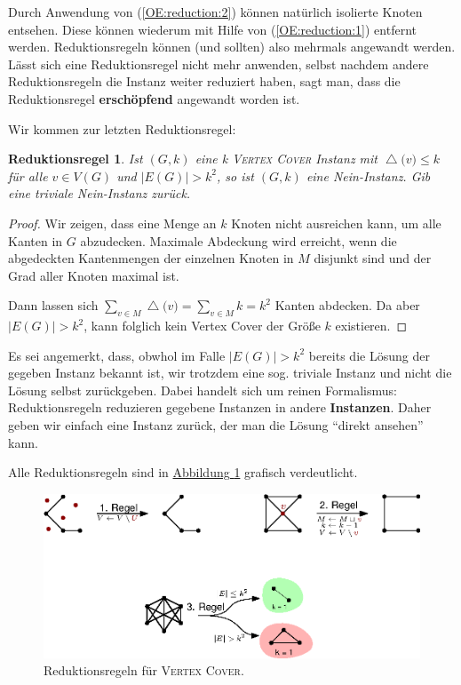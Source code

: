 \documentclass[a4paper,ngerman]{atseminar}
\renewcommand{\deg}[1]{\ensuremath{\operatorname{\triangle}\bigl(#1\bigr)}\xspace}
\newtheorem{reductionrule}[theorem]{\textbf{Reduktionsregel}}
\begin{document}
\begin{example}
    \noindent
    Durch Anwendung von (\ref{OE:reduction:2}) können natürlich isolierte Knoten entsehen. Diese können wiederum mit Hilfe von (\ref{OE:reduction:1}) entfernt
    werden.
    Reduktionsregeln können (und sollten) also mehrmals angewandt werden. Lässt sich eine Reduktionsregel nicht mehr anwenden, selbst nachdem andere Reduktionsregeln
    die Instanz weiter reduziert haben, sagt man, dass die Reduktionsregel \textbf{erschöpfend} angewandt worden ist.

    \noindent
    Wir kommen zur letzten Reduktionsregel:

    \begin{reductionrule}
      \label{OE:reduction:3}
      Ist $(G, k)$ eine k \textsc{Vertex Cover} Instanz mit $\deg{v} \leq k$ für alle $ v \in V(G)$ und $|E(G)| > k^2$, so ist $(G, k)$
      eine Nein-Instanz. Gib eine triviale Nein-Instanz zurück. 
    \end{reductionrule}
    \begin{proof}
      Wir zeigen, dass eine Menge an $k$ Knoten nicht ausreichen kann, um alle Kanten in $G$ abzudecken.
      \noindent
      Maximale Abdeckung wird erreicht, wenn die abgedeckten Kantenmengen der einzelnen Knoten in $M$ disjunkt sind und der Grad aller Knoten maximal ist.
      
      \noindent
      Dann lassen sich $\sum_{v \in M}{\deg{v}} = \sum_{v \in M}{k} = k^2$ Kanten abdecken.
      \noindent
      Da aber $|E(G)| > k^2$, kann folglich kein Vertex Cover der Größe $k$ existieren.
    \end{proof}
    Es sei angemerkt, dass, obwhol im Falle $|E(G)| > k^2$ bereits die Lösung der gegeben Instanz bekannt ist, wir trotzdem eine sog. triviale Instanz
    und nicht die Lösung selbst zurückgeben. Dabei handelt sich um reinen Formalismus: Reduktionsregeln reduzieren gegebene Instanzen in
    andere \textbf{Instanzen}. Daher geben wir einfach eine Instanz zurück, der man die Lösung \enquote{direkt ansehen} kann.

    \noindent
    Alle Reduktionsregeln sind in \hyperref[OE:fig:reductionRules]{Abbildung }\ref{OE:fig:reductionRules} grafisch verdeutlicht.

    \begin{figure}[h]
      \centering
      \includegraphics[scale = 1.0]{./images/reduction-rules.eps}
      \caption{Reduktionsregeln für \textsc{Vertex Cover}.}
      \label{OE:fig:reductionRules}
     \end{figure}
    

\end{example}
\end{document}
